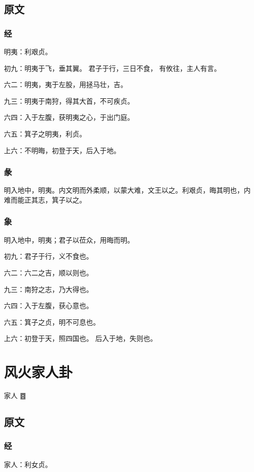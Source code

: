 \documentclass[12pt,oneside]{book}
\begin{document}
\section{原文}

\subsection{经}
明夷：利艰贞。

初九：明夷于飞，垂其翼。 君子于行，三日不食， 有攸往，主人有言。

六二：明夷，夷于左股，用拯马壮，吉。

九三：明夷于南狩，得其大首，不可疾贞。

六四：入于左腹，获明夷之心，于出门庭。

六五：箕子之明夷，利贞。

上六：不明晦，初登于天，后入于地。

\subsection{彖}
明入地中，明夷。内文明而外柔顺，以蒙大难，文王以之。利艰贞，晦其明也，内难而能正其志，箕子以之。

\subsection{象}
明入地中，明夷；君子以莅众，用晦而明。

初九：君子于行，义不食也。

六二：六二之吉，顺以则也。

九三：南狩之志，乃大得也。

六四：入于左腹，获心意也。

六五：箕子之贞，明不可息也。

上六：初登于天，照四国也。 后入于地，失则也。

\chapter{风火家人卦}
家人 {\Large ䷤}

\section{原文}

\subsection{经}
家人：利女贞。
\end{document}
